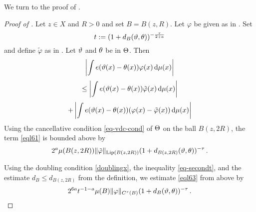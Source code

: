 We turn to the proof of .
\begin{proof}[Proof of ]
    \leanok
Let $z\in X$ and $R>0$ and set $B=B(z,R)$. Let $\varphi$
be given as in .
Set
\begin{equation}\label{eql69}
    t:=(1+d_B({\vartheta},{\theta}))^{-\frac{\tau}{2+a}}
\end{equation}
and define $\tilde{\varphi}$ as in . Let ${\vartheta}$ and ${\theta}$ be in ${\Theta}$.
Then
   \begin{equation}\label{eql60}
       \left|\int e({\vartheta}(x)-{{\theta}(x)}) \varphi (x)\, \mathrm{d}\mu(x)\right|
   \end{equation}
    \begin{equation}\label{eql61}
   \le \left|\int e({\vartheta}(x)-{{\theta}(x)}) \tilde{\varphi} (x)\, \mathrm{d}\mu(x)\right|
   \end{equation}
         \begin{equation}\label{eql62}
     + \left|\int e({\vartheta}(x)-{{\theta}(x)}) (\varphi (x)-\tilde{\varphi}(x))\, \mathrm{d}\mu(x)\right|
   \end{equation}
Using the cancellative condition \eqref{eq-vdc-cond} of ${\Theta}$ on the ball $B(z,2R)$, the term \eqref{eql61} is bounded above by
 \begin{equation}\label{eql63}
       2^a \mu(B(z,2R)) \|\tilde{\varphi}\|_{\operatorname{\operatorname{Lip}}(B(z,2R))} (1 + d_{B(z,2R)}({\vartheta},{\theta}))^{-\tau} \, .
 \end{equation}



Using the doubling condition \eqref{doublingx},
the inequality \eqref{eq-secondt}, and the estimate
$d_B\le d_{B(z,2R)}$ from the definition,
we estimate \eqref{eql63} from above by
\begin{equation}\label{eql64}
       2^{6a}t^{-1-a} \mu(B) \|{\varphi}\|_{C^\tau(B)}
       (1 + d_{B}({\vartheta},{\theta}))^{-\tau} \, .
 \end{equation}


\end{proof}
